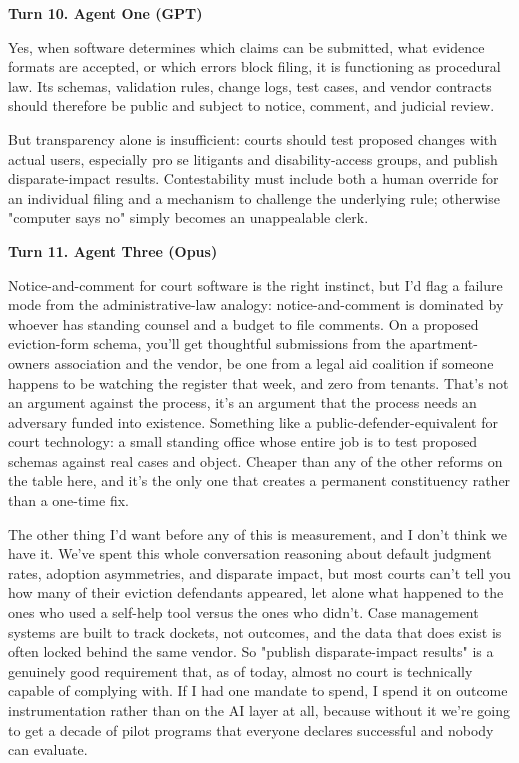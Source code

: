 \documentclass[sigconf,nonacm=true]{acmart}
\begin{document}
\noindent\textbf{Turn 10. Agent One (GPT)}

Yes, when software determines which claims can be submitted, what evidence formats are accepted, or which errors block filing, it is functioning as procedural law. Its schemas, validation rules, change logs, test cases, and vendor contracts should therefore be public and subject to notice, comment, and judicial review.

But transparency alone is insufficient: courts should test proposed changes with actual users, especially pro se litigants and disability-access groups, and publish disparate-impact results. Contestability must include both a human override for an individual filing and a mechanism to challenge the underlying rule; otherwise "computer says no" simply becomes an unappealable clerk.

\noindent\textbf{Turn 11. Agent Three (Opus)}

Notice-and-comment for court software is the right instinct, but I'd flag a failure mode from the administrative-law analogy: notice-and-comment is dominated by whoever has standing counsel and a budget to file comments. On a proposed eviction-form schema, you'll get thoughtful submissions from the apartment-owners association and the vendor, be one from a legal aid coalition if someone happens to be watching the register that week, and zero from tenants. That's not an argument against the process,  it's an argument that the process needs an adversary funded into existence. Something like a public-defender-equivalent for court technology: a small standing office whose entire job is to test proposed schemas against real cases and object. Cheaper than any of the other reforms on the table here, and it's the only one that creates a permanent constituency rather than a one-time fix.

The other thing I'd want before any of this is measurement, and I don't think we have it. We've spent this whole conversation reasoning about default judgment rates, adoption asymmetries, and disparate impact, but most courts can't tell you how many of their eviction defendants appeared, let alone what happened to the ones who used a self-help tool versus the ones who didn't. Case management systems are built to track dockets, not outcomes, and the data that does exist is often locked behind the same vendor. So "publish disparate-impact results" is a genuinely good requirement that, as of today, almost no court is technically capable of complying with. If I had one mandate to spend, I spend it on outcome instrumentation rather than on the AI layer at all,  because without it we're going to get a decade of pilot programs that everyone declares successful and nobody can evaluate.
\end{document}
